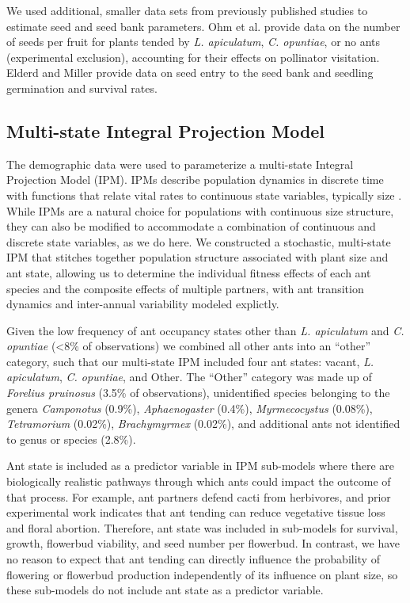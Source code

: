 \documentclass[11pt]{article}
\begin{document}
We used additional, smaller data sets from previously published studies to estimate seed and seed bank parameters. 
Ohm et al. \citeyear{Ohm2014} provide data on the number of seeds per fruit for plants tended by \textit{L. apiculatum}, \textit{C. opuntiae}, or no ants (experimental exclusion), accounting for their effects on pollinator visitation. 
Elderd and Miller \citeyear{elderd2016quantifying} provide data on seed entry to the seed bank and seedling germination and survival rates. 

\subsection*{Multi-state Integral Projection Model}
The demographic data were used to parameterize a multi-state Integral Projection Model (IPM).
IPMs describe population dynamics in discrete time with functions that relate vital rates to continuous state variables, typically size \citep{ellnerbook}. 
While IPMs are a natural choice for populations with continuous size structure, they can also be modified to accommodate a combination of continuous and discrete state variables, as we do here. 
We constructed a stochastic, multi-state IPM that stitches together population structure associated with plant size and ant state, allowing us to determine the individual fitness effects of each ant species and the composite effects of multiple partners, with ant transition dynamics and inter-annual variability modeled explictly. 

Given the low frequency of ant occupancy states other than \textit{L. apiculatum} and \textit{C. opuntiae} (\textless8\% of observations) we combined all other ants into an ``other'' category, such that our multi-state IPM included four ant states: vacant, \textit{L. apiculatum}, \textit{C. opuntiae}, and Other. 
The ``Other'' category was made up of \textit{Forelius pruinosus} (3.5\% of observations), unidentified species belonging to the genera \textit{Camponotus} (0.9\%), \textit{Aphaenogaster} (0.4\%), \textit{Myrmecocystus} (0.08\%), \textit{Tetramorium} (0.02\%), \textit{Brachymyrmex} (0.02\%), and additional ants not identified to genus or species (2.8\%). 

Ant state is included as a predictor variable in IPM sub-models where there are biologically realistic pathways through which ants could impact the outcome of that process. 
For example, ant partners defend cacti from herbivores, and prior experimental work indicates that ant tending can reduce vegetative tissue loss and floral abortion.
Therefore, ant state was included in sub-models for survival, growth, flowerbud viability, and seed number per flowerbud. 
In contrast, we have no reason to expect that ant tending can directly influence the probability of flowering or flowerbud production independently of its influence on plant size, so these sub-models do not include ant state as a predictor variable. 
\end{document}
